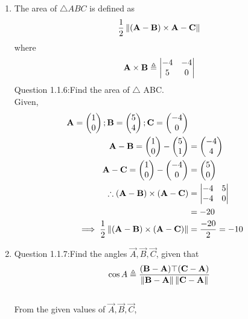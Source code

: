 \documentclass[11pt]{book}
\begin{document}
\begin{enumerate}[label=\thesection.\arabic*.,ref=\thesection.\theenumi]
\item The area of $\triangle ABC$ is defined as
		\begin{align}
			\frac{1}{2}\left\lVert{\ensuremath{\left(\mathbf{A}-\mathbf{B}\right)}\times {\mathbf{A}-\mathbf{C}}}\right\rVert
		\end{align}
		where
		\begin{align}
			\mathbf{A}\times\mathbf{B} \triangleq \begin{vmatrix}-4 & -4 \\5 & 0\end{vmatrix}
		\end{align}
Question 1.1.6:Find the area of $\triangle$ ABC.\\
\solution
Given,
\begin{align}
\mathbf{A} = \begin{pmatrix}1\\0\end{pmatrix};
\mathbf{B} = \begin{pmatrix}5\\4\end{pmatrix};
\mathbf{C} = \begin{pmatrix}-4\\0\end{pmatrix}\\
\mathbf{A}-\mathbf{B}=\begin{pmatrix}1\\0\end{pmatrix}-\begin{pmatrix}5\\1\end{pmatrix}&=\begin{pmatrix}-4\\4\end{pmatrix}\\
\mathbf{A}-\mathbf{C}=\begin{pmatrix}1\\0\end{pmatrix}-\begin{pmatrix}-4\\0\end{pmatrix}&=\begin{pmatrix}5\\0\end{pmatrix}\\
\therefore(\mathbf{A}-\mathbf{B})\times(\mathbf{A}-\mathbf{C}) &=\begin{vmatrix}-4 & 5\\-4 & 0\end{vmatrix}\\&=-20\\
\implies\frac{1}{2}\left\lVert(\mathbf{A}-\mathbf{B})\times(\mathbf{A}-\mathbf{C})\right\rVert&=\frac{-20}{2}=-10
\end{align}


\item
Question 1.1.7:Find the angles $\vec{A},\vec{B},\vec{C}$, given that 
\begin{align}
	\cos{A} \triangleq \frac{(\mathbf{B}-\mathbf{A})\top(\mathbf{C}-\mathbf{A})}{\left\lVert\mathbf{B}-\mathbf{A}\right\rVert\left\lVert\mathbf{C}-\mathbf{A}\right\rVert}
\end{align}
\solution 
\\
From the given values of $\vec{A},\vec{B},\vec{C}$,\\
\begin{enumerate}


\end{enumerate}
\end{enumerate}
\end{document}
